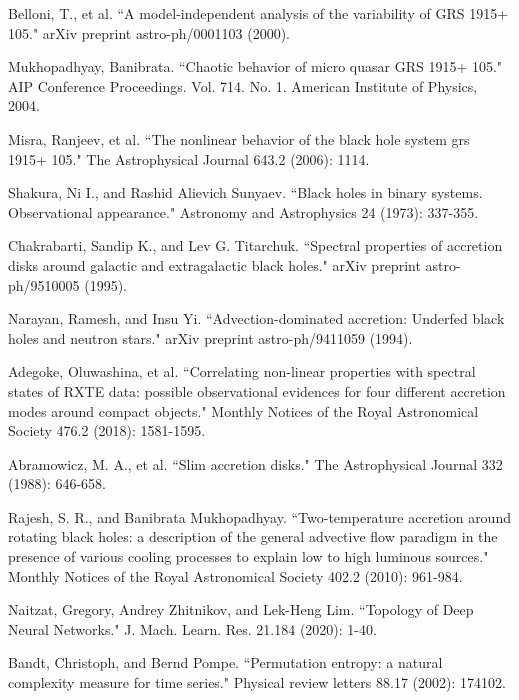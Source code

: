 \documentclass[10pt,conference]{IEEEtran}
\begin{document}
\begin{thebibliography}{1}

Belloni, T., et al. ``A model-independent analysis of the variability of GRS 1915+ 105." arXiv preprint astro-ph/0001103 (2000).

Mukhopadhyay, Banibrata. ``Chaotic behavior of micro quasar GRS 1915+ 105." AIP Conference Proceedings. Vol. 714. No. 1. American Institute of Physics, 2004.

Misra, Ranjeev, et al. ``The nonlinear behavior of the black hole system grs 1915+ 105." The Astrophysical Journal 643.2 (2006): 1114.

Shakura, Ni I., and Rashid Alievich Sunyaev. ``Black holes in binary systems. Observational appearance." Astronomy and Astrophysics 24 (1973): 337-355.

Chakrabarti, Sandip K., and Lev G. Titarchuk. ``Spectral properties of accretion disks around galactic and extragalactic black holes." arXiv preprint astro-ph/9510005 (1995).

Narayan, Ramesh, and Insu Yi. ``Advection-dominated accretion: Underfed black holes and neutron stars." arXiv preprint astro-ph/9411059 (1994).

Adegoke, Oluwashina, et al. ``Correlating non-linear properties with spectral states of RXTE data: possible observational evidences for four different accretion modes around compact objects." Monthly Notices of the Royal Astronomical Society 476.2 (2018): 1581-1595.

Abramowicz, M. A., et al. ``Slim accretion disks." The Astrophysical Journal 332 (1988): 646-658.

Rajesh, S. R., and Banibrata Mukhopadhyay. ``Two-temperature accretion around rotating black holes: a description of the general advective flow paradigm in the presence of various cooling processes to explain low to high luminous sources." Monthly Notices of the Royal Astronomical Society 402.2 (2010): 961-984.

Naitzat, Gregory, Andrey Zhitnikov, and Lek-Heng Lim. ``Topology of Deep Neural Networks." J. Mach. Learn. Res. 21.184 (2020): 1-40.

Bandt, Christoph, and Bernd Pompe. ``Permutation entropy: a natural complexity measure for time series." Physical review letters 88.17 (2002): 174102.


\end{thebibliography}
\end{document}
